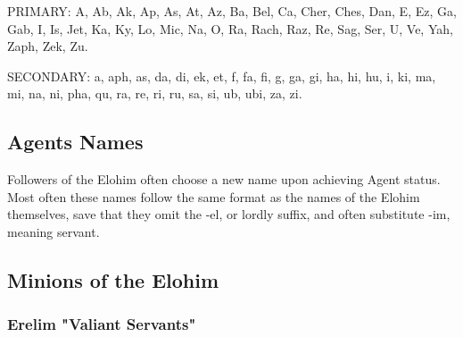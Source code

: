 PRIMARY:
A, Ab, Ak, Ap, As, At, Az, Ba, Bel, Ca, Cher, Ches, Dan, E, Ez, Ga, Gab, I, Is, Jet, Ka, Ky, Lo, Mic, Na, O, Ra, Rach, Raz, Re, Sag, Ser, U, Ve, Yah, Zaph, Zek, Zu.

SECONDARY:
a, aph, as, da, di, ek, et, f, fa, fi, g, ga, gi, ha, hi, hu, i, ki, ma, mi, na, ni, pha, qu, ra, re, ri, ru, sa, si, ub, ubi, za, zi. 

\subsection{Agents Names}

Followers of the Elohim often choose a new name upon achieving Agent
status. Most often these names follow the same format as the names of
the Elohim themselves, save that they omit the -el, or lordly suffix,
and often substitute -im, meaning servant.

\subsection{Minions of the Elohim}

\subsubsection{Erelim "Valiant Servants"}

